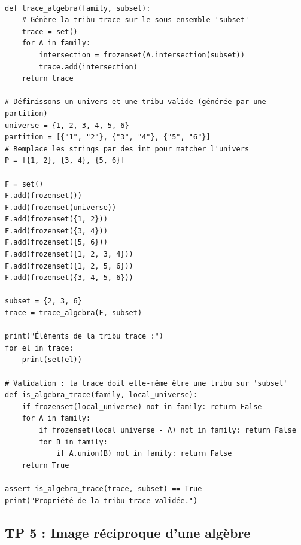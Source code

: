 \documentclass[11pt,a4paper]{article}
\begin{document}
\begin{lstlisting}

def trace_algebra(family, subset):
    # Génère la tribu trace sur le sous-ensemble 'subset'
    trace = set()
    for A in family:
        intersection = frozenset(A.intersection(subset))
        trace.add(intersection)
    return trace

# Définissons un univers et une tribu valide (générée par une partition)
universe = {1, 2, 3, 4, 5, 6}
partition = [{"1", "2"}, {"3", "4"}, {"5", "6"}]
# Remplace les strings par des int pour matcher l'univers
P = [{1, 2}, {3, 4}, {5, 6}]

F = set()
F.add(frozenset())
F.add(frozenset(universe))
F.add(frozenset({1, 2}))
F.add(frozenset({3, 4}))
F.add(frozenset({5, 6}))
F.add(frozenset({1, 2, 3, 4}))
F.add(frozenset({1, 2, 5, 6}))
F.add(frozenset({3, 4, 5, 6}))

subset = {2, 3, 6}
trace = trace_algebra(F, subset)

print("Éléments de la tribu trace :")
for el in trace:
    print(set(el))

# Validation : la trace doit elle-même être une tribu sur 'subset'
def is_algebra_trace(family, local_universe):
    if frozenset(local_universe) not in family: return False
    for A in family:
        if frozenset(local_universe - A) not in family: return False
        for B in family:
            if A.union(B) not in family: return False
    return True

assert is_algebra_trace(trace, subset) == True
print("Propriété de la tribu trace validée.")

\end{lstlisting}


\subsection*{TP 5 : Image réciproque d'une algèbre}
\end{document}

